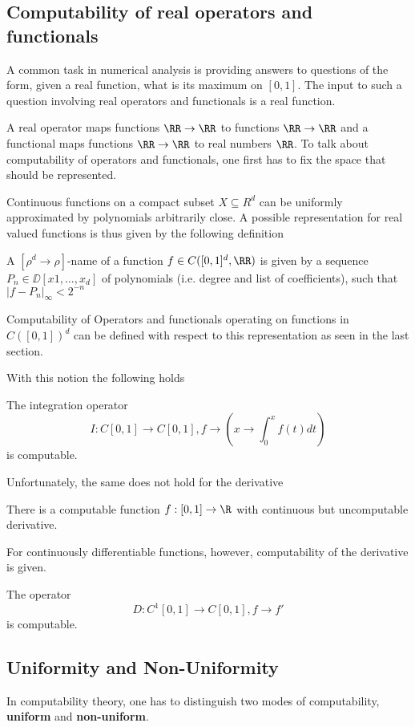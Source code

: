 \subsection{Computability of real operators and functionals}
A common task in numerical analysis is providing answers to questions of the
form, given a real function, what is its maximum on $[0,1]$.
The input to such a question involving real operators and functionals is a real function.

A real operator maps functions $\RR \to \RR$ to functions $\RR \to \RR$ and a functional maps functions $\RR \to \RR$ to real numbers $\RR$.
To talk about computability of operators and functionals, one first has to fix
the space that should be represented.

Continuous functions on a compact subset $X \subseteq R^d$ can be uniformly approximated by polynomials arbitrarily close.
A possible representation for real valued functions is thus given by the following definition 
\begin{definition}
A $[\rho^d \to \rho]$-name of a function $f \in C([0,1]^d, \RR)$ is given by a
sequence $P_n \in \DD[x1, \dots, x_d]$ of polynomials (i.e. degree and list of
coefficients), such that $\vert f - P_n \vert_\infty < 2^{-n}$
\end{definition}
Computability of Operators and functionals operating on functions in
$C([0,1])^d$ can be defined with respect to this representation as seen in the
last section.

With this notion the following holds
\begin{theorem}
The integration operator 
$$I: C[0,1] \to C[0,1], f \to \left(x \to \int_0^x f(t) dt\right)$$   
is computable.
\end{theorem}
Unfortunately, the same does not hold for the derivative
\begin{theorem}[Myhill 1971]
There is a computable function $f: [0,1] \to \R$ with continuous but uncomputable derivative. 
\end{theorem}
For continuously differentiable functions, however, computability of the
derivative is given. 
\begin{theorem}
The operator 
$$ D: C^1[0,1] \to C[0,1], f \to f'$$
is computable.
\end{theorem}
\subsection{Uniformity and Non-Uniformity}
In computability theory, one has to distinguish two modes of computability, \textbf{uniform} and \textbf{non-uniform}.

